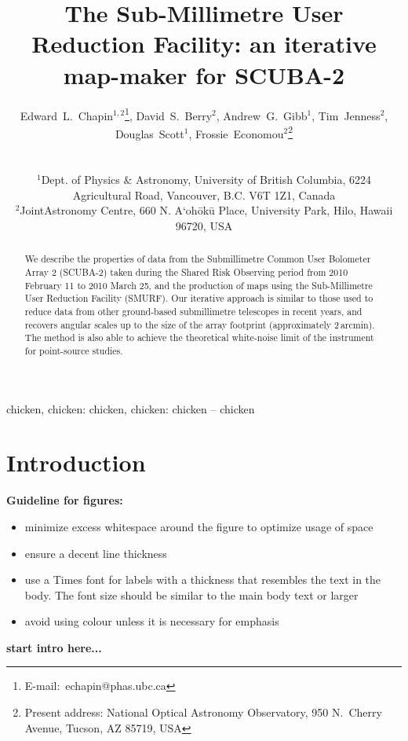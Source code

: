 \documentclass[useAMS,usenatbib,nofootinbib]{mn2e}
\title[SMURF: an iterative map-maker for SCUBA-2]{The Sub-Millimetre User
Reduction Facility: an iterative map-maker for SCUBA-2}
\author[Edward~L.~Chapin~et~al.]{
  \parbox[t]{\textwidth}{
    Edward~L.~Chapin$^{1,2}$\thanks{E-mail:~echapin@phas.ubc.ca},
    David~S.~Berry$^{2}$,
    Andrew~G.~Gibb$^{1}$,
    Tim~Jenness$^{2}$,
    Douglas~Scott$^{1}$,
    Frossie~Economou$^2$\thanks{Present address: National Optical
      Astronomy Observatory, 950 N.\ Cherry Avenue, Tucson, AZ 85719, USA}
  }
  \\
  \\
  $^{1}$Dept. of Physics \& Astronomy, University of British Columbia,
  6224 Agricultural Road, Vancouver, B.C. V6T 1Z1, Canada\\
  $^{2}$JointAstronomy Centre, 660 N. A`oh\={o}k\={u} Place, University
  Park, Hilo, Hawaii 96720, USA}
\begin{document}
\label{firstpage}

\maketitle

\begin{abstract}
  We describe the properties of data from the Submillimetre Common
  User Bolometer Array 2 (SCUBA-2) taken during the Shared Risk
  Observing period from 2010 February 11 to 2010 March 25, and the
  production of maps using the Sub-Millimetre User Reduction Facility
  (SMURF). Our iterative approach is similar to those used to reduce
  data from other ground-based submillimetre telescopes in recent
  years, and recovers angular scales up to the size of the array
  footprint (approximately 2\,arcmin). The method is also able to
  achieve the theoretical white-noise limit of the instrument for
  point-source studies.
\end{abstract}


\begin{keywords}
chicken, chicken: chicken, chicken: chicken -- chicken
\end{keywords}

\section{Introduction}
\label{sec:intro}

\textbf{Guideline for figures:}

\begin{itemize}
\item minimize excess whitespace around the figure to optimize usage of space
\item ensure a decent line thickness
\item use a Times font for labels with a thickness that resembles the
  text in the body. The font size should be similar to the main body
  text or larger
\item avoid using colour unless it is necessary for emphasis
\end{itemize}

\textbf{start intro here...}
\end{document}
